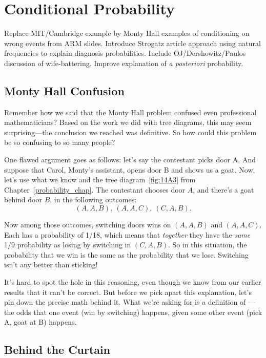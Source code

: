 \chapter{Conditional Probability}\label{chap:cond_prob} %

\begin{editingnotes}
 Replace MIT/Cambridge example by Monty Hall
examples of conditioning on wrong events from ARM slides.  Introduce
Strogatz article approach using natural frequencies to explain
diagnosis probabilities.  Include OJ/Dershowitz/Paulos discussion of
wife-battering.  Improve explanation of \emph{a posteriori}
probability.
\end{editingnotes}

\section{Monty Hall Confusion}\label{sec:confuse_Monty}
Remember how we said that the Monty Hall problem confused even
professional mathematicians?  Based on the work we did with tree
diagrams, this may seem surprising---the conclusion we reached was
definitive.  So how could this problem be so confusing to so many
people?

One flawed argument goes as follows: let's say the contestant picks
door A.  And suppose that Carol, Monty's assistant, opens door B and
shows us a goat.  Now, let's use what we know and the tree
diagram~\ref{fig:14A3} from Chapter~\ref{probability_chap}.  The
contestant chooses door $A$, and there's a goat behind door $B$, in
the following outcomes:
\[
(A, A, B),\ (A, A, C),\ (C, A, B).
\]

Now among those outcomes, switching doors wins on $(A, A, B)$ and $(A,
A, C)$.  Each has a probability of 1/18, which means that
\emph{together} they have the \emph{same} 1/9 probability as losing by
switching in $(C, A, B)$.  So in this situation, the probability that
we win is the same as the probability that we lose.  Switching isn't
any better than sticking!

It's hard to spot the hole in this reasoning, even though we know from
our earlier results that it can't be correct.  But before we pick
apart this explanation, let's pin down the precise math behind it.
What we're asking for is a definition of ---the odds that one event (win by switching) happens,
given some other event (pick A, goat at B) happens.

\section{Behind the Curtain}

